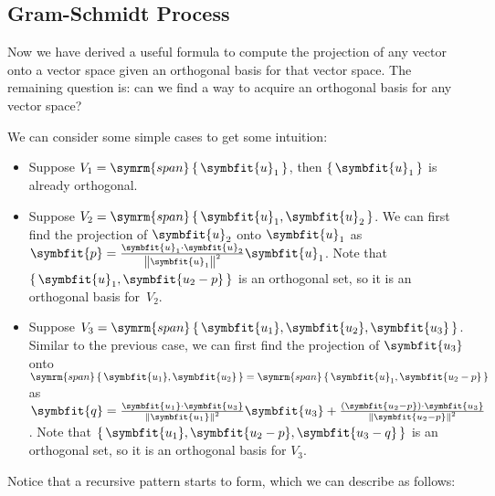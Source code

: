 \documentclass[math]{amznotes}
\theoremstyle{remark}
\begin{document}
\subsection{Gram-Schmidt Process}
Now we have derived a useful formula to compute the projection of any vector onto a vector space given an orthogonal basis for that vector space. The remaining question is: can we find a way to acquire an orthogonal basis for any vector space?

We can consider some simple cases to get some intuition:

\begin{itemize}
    \item Suppose $V_1 = \symrm{span}\left\{\, \symbfit{u}_1 \,\right\}$, then $\left\{\, \symbfit{u}_1 \,\right\}$ is already orthogonal.
    \item Suppose $V_2 = \symrm{span}\left\{\, \symbfit{u}_1, \symbfit{u}_2 \,\right\}$. We can first find the projection of $\symbfit{u}_2$ onto $\symbfit{u}_1$ as $\symbfit{p} = \frac{\symbfit{u}_1 \cdot \symbfit{u}_2}{\left\lVert \symbfit{u}_1 \right\rVert^2}\symbfit{u}_1$. Note that $\left\{\, \symbfit{u}_1, \symbfit{u_2 - p} \,\right\}$ is an orthogonal set, so it is an orthogonal basis for~$V_2$.
    \item Suppose $V_3 = \symrm{span}\left\{\, \symbfit{u_1}, \symbfit{u_2}, \symbfit{u_3} \,\right\}$. Similar to the previous case, we can first find the projection of $\symbfit{u_3}$ onto $\symrm{span}\left\{\, \symbfit{u_1}, \symbfit{u_2} \,\right\} = \symrm{span}\left\{\, \symbfit{u}_1, \symbfit{u_2 - p} \,\right\}$ as $\symbfit{q} = \frac{\symbfit{u_1} \cdot \symbfit{u_3}}{\left\lVert \symbfit{u_1} \right\rVert^2}\symbfit{u_3} + \frac{(\symbfit{u_2 - p}) \cdot \symbfit{u_3}}{\left\lVert \symbfit{u_2 - p}\right\rVert^2}$. Note that $\left\{\, \symbfit{u_1}, \symbfit{u_2 - p}, \symbfit{u_3 - q} \,\right\}$ is an orthogonal set, so it is an orthogonal basis for $V_3$.
\end{itemize}
Notice that a recursive pattern starts to form, which we can describe as follows:
\end{document}
